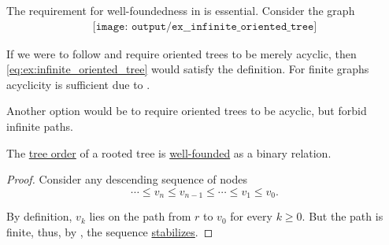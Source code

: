 \begin{example}\label{ex:infinite_oriented_tree}
  The requirement for well-foundedness in  is essential. Consider the graph
  \begin{equation}\label{eq:ex:infinite_oriented_tree}
    \begin{aligned}
      \texttt{[image: output/ex\_\_infinite\_oriented\_tree]}
    \end{aligned}
  \end{equation}

  If we were to follow  and require oriented trees to be merely acyclic, then \eqref{eq:ex:infinite_oriented_tree} would satisfy the definition. For finite graphs acyclicity is sufficient due to .

  Another option would be to require oriented trees to be acyclic, but forbid infinite paths.
\end{example}

\begin{lemma}\label{thm:tree_order_well_founded}
  The \hyperref[def:rooted_tree/order]{tree order} of a rooted tree is \hyperref[def:well_founded_relation]{well-founded} as a binary relation.
\end{lemma}
\begin{proof}
  Consider any descending sequence of nodes
  \begin{equation*}
    \cdots \leq v_n \leq v_{n-1} \leq \cdots \leq v_1 \leq v_0.
  \end{equation*}

  By definition, \( v_k \) lies on the path from \( r \) to \( v_0 \) for every \( k \geq 0 \). But the path is finite, thus, by , the sequence \hyperref[def:stabilizing_sequence]{stabilizes}.
\end{proof}

